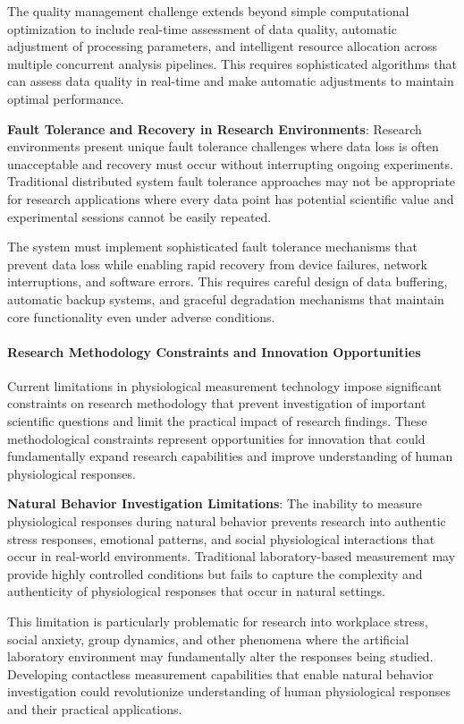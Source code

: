 \documentclass[12pt,a4paper]{report}
\begin{document}
The quality management challenge extends beyond simple computational optimization to include real-time assessment of
data quality, automatic adjustment of processing parameters, and intelligent resource allocation across multiple
concurrent analysis pipelines. This requires sophisticated algorithms that can assess data quality in real-time and make
automatic adjustments to maintain optimal performance.

\textbf{Fault Tolerance and Recovery in Research Environments}: Research environments present unique fault tolerance
challenges where data loss is often unacceptable and recovery must occur without interrupting ongoing experiments.
Traditional distributed system fault tolerance approaches may not be appropriate for research applications where every
data point has potential scientific value and experimental sessions cannot be easily repeated.

The system must implement sophisticated fault tolerance mechanisms that prevent data loss while enabling rapid recovery
from device failures, network interruptions, and software errors. This requires careful design of data buffering,
automatic backup systems, and graceful degradation mechanisms that maintain core functionality even under adverse
conditions.

\paragraph{Research Methodology Constraints and Innovation Opportunities}

Current limitations in physiological measurement technology impose significant constraints on research methodology that
prevent investigation of important scientific questions and limit the practical impact of research findings. These
methodological constraints represent opportunities for innovation that could fundamentally expand research capabilities
and improve understanding of human physiological responses.

\textbf{Natural Behavior Investigation Limitations}: The inability to measure physiological responses during natural behavior
prevents research into authentic stress responses, emotional patterns, and social physiological interactions that occur
in real-world environments. Traditional laboratory-based measurement may provide highly controlled conditions but fails
to capture the complexity and authenticity of physiological responses that occur in natural settings.

This limitation is particularly problematic for research into workplace stress, social anxiety, group dynamics, and
other phenomena where the artificial laboratory environment may fundamentally alter the responses being studied.
Developing contactless measurement capabilities that enable natural behavior investigation could revolutionize
understanding of human physiological responses and their practical applications.
\end{document}

